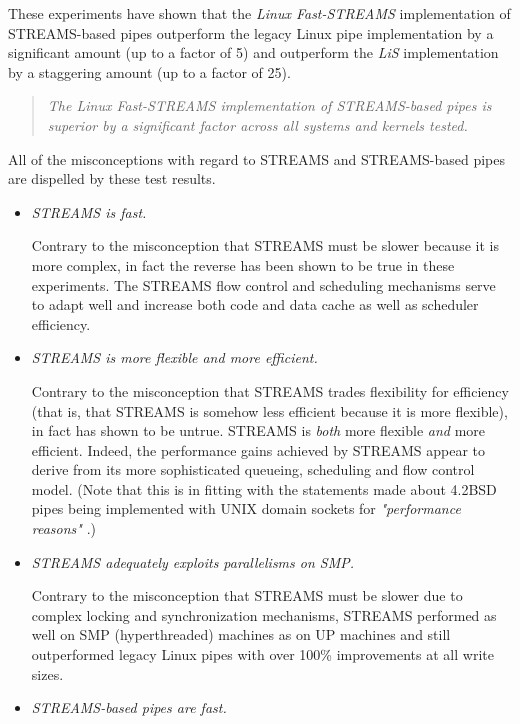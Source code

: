 \documentclass[letterpaper,final,notitlepage,twocolumn,10pt,twoside]{article}
\begin{document}
These experiments have shown that the \textsl{Linux Fast-STREAMS}
implementation of STREAMS-based pipes outperform the legacy Linux pipe
implementation by a significant amount (up to a factor of 5) and outperform
the \textsl{LiS} implementation by a staggering amount (up to a factor of 25).

\begin{quote}
\textit{The \textsl{Linux Fast-STREAMS} implementation of STREAMS-based pipes
is superior by a significant factor across all systems and kernels tested.}
\end{quote}

All of the misconceptions with regard to STREAMS and STREAMS-based pipes are
dispelled by these test results.

\begin{itemize}

\item \textit{STREAMS is fast.}

Contrary to the misconception that STREAMS must be slower because it is more
complex, in fact the reverse has been shown to be true in these experiments.
The STREAMS flow control and scheduling mechanisms serve to adapt well and
increase both code and data cache as well as scheduler efficiency.

\item \textit{STREAMS is more flexible {\em and} more efficient.}

Contrary to the misconception that STREAMS trades flexibility for efficiency
(that is, that STREAMS is somehow less efficient because it is more flexible),
in fact has shown to be untrue.  STREAMS is {\em both} more flexible {\em and}
more efficient.  Indeed, the performance gains achieved by STREAMS appear to
derive from its more sophisticated queueing, scheduling and flow control
model. (Note that this is in fitting with the statements made about 4.2BSD
pipes being implemented with UNIX domain sockets for \textit{"performance
reasons"} \cite[]{bsd}.)

\item \textit{STREAMS adequately exploits parallelisms on SMP.}

Contrary to the misconception that STREAMS must be slower due to complex
locking and synchronization mechanisms, STREAMS performed as well on SMP
(hyperthreaded) machines as on UP machines and still outperformed legacy Linux
pipes with over 100\% improvements at all write sizes.

\item \textit{STREAMS-based pipes are fast.}


\end{itemize}
\end{document}

